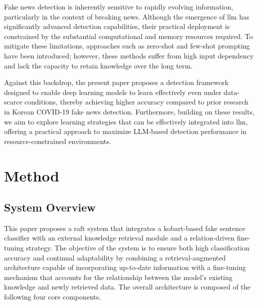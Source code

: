 \documentclass[a4paper,fleqn]{cas-sc}
\begin{document}
Fake news detection is inherently sensitive to rapidly evolving information, particularly in the context of breaking news. Although the emergence of \gls{llm} has significantly advanced detection capabilities, their practical deployment is constrained by the substantial computational and memory resources required. To mitigate these limitations, approaches such as zero-shot and few-shot prompting have been introduced; however, these methods suffer from high input dependency and lack the capacity to retain knowledge over the long term.

Against this backdrop, the present paper proposes a detection framework designed to enable deep learning models to learn effectively even under data-scarce conditions, thereby achieving higher accuracy compared to prior research in Korean COVID-19 fake news detection. Furthermore, building on these results, we aim to explore learning strategies that can be effectively integrated into \gls{llm}, offering a practical approach to maximize LLM-based detection performance in resource-constrained environments.


\section{Method}


\subsection{System Overview}

This paper proposes a \gls{raft} system that integrates a \gls{kobart}-based fake sentence classifier with an external knowledge retrieval module and a relation-driven fine-tuning strategy. The objective of the system is to ensure both high classification accuracy and continual adaptability by combining a retrieval-augmented architecture capable of incorporating up-to-date information with a fine-tuning mechanism that accounts for the relationship between the model's existing knowledge and newly retrieved data. The overall architecture is composed of the following four core components.
\end{document}
